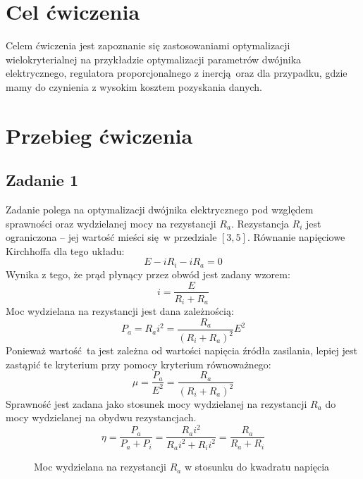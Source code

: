 \documentclass[a4paper, 12pt]{article}
\begin{document}
	\noindent
	\section{Cel ćwiczenia}
        Celem ćwiczenia jest zapoznanie się zastosowaniami optymalizacji wielokryterialnej na
        przykładzie optymalizacji parametrów dwójnika elektrycznego, regulatora proporcjonalnego 
        z inercją oraz dla przypadku, gdzie mamy do czynienia z wysokim kosztem pozyskania danych.
	\section{Przebieg ćwiczenia}
        \subsection{Zadanie 1}
            Zadanie polega na optymalizacji dwójnika elektrycznego pod względem sprawności oraz 
            wydzielanej mocy na rezystancji $R_a$. Rezystancja $R_i$ jest ograniczona -- jej wartość 
            mieści się w przedziale $[3, 5]$. Równanie napięciowe Kirchhoffa dla tego układu:
            $$
                E - iR_i - iR_a = 0
            $$
            Wynika z tego, że prąd płynący przez obwód jest zadany wzorem:
            $$
                i = \frac{E}{R_i + R_a}
            $$
            Moc wydzielana na rezystancji jest dana zależnością:
            $$
                P_a = R_a i^2 = \frac{R_a}{(R_i + R_a)^2} E ^ 2
            $$
            Ponieważ wartość ta jest zależna od wartości napięcia źródła zasilania, lepiej jest zastąpić
            te kryterium przy pomocy kryterium równoważnego:
            $$
                \mu = \frac{P_a}{E^2} = \frac{R_a}{(R_i + R_a)^2}
            $$
            Sprawność jest zadana jako stosunek mocy wydzielanej na rezystancji $R_a$ do mocy
            wydzielanej na obydwu rezystancjach.
            $$
                \eta = \frac{P_a}{P_a + P_i} = \frac{R_ai^2}{R_ai^2 + R_ii^2} = \frac{R_a}{R_a + R_i}
            $$
            \begin{figure}[H]
                \centering
                \def \svgwidth{0.7\columnwidth}
                
                \caption{Moc wydzielana na rezystancji $R_a$ w stosunku do kwadratu napięcia}
            \end{figure}\noindent
            
\end{document}

